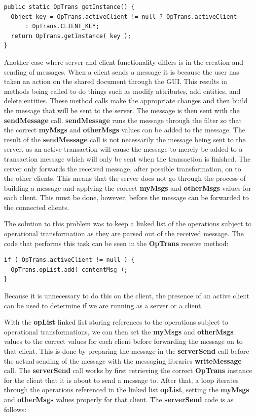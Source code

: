 \documentclass{article}
\begin{document}
\begin{verbatim}
public static OpTrans getInstance() {
  Object key = OpTrans.activeClient != null ? OpTrans.activeClient
      : OpTrans.CLIENT_KEY;
  return OpTrans.getInstance( key );
}
\end{verbatim}

Another case where server and client functionality differs is in the
creation and sending of messages.  When a client sends a message it is
because the user has taken an action on the shared document through
the GUI.  This results in methods being called to do things such as
modify attributes, add entities, and delete entities.  These method
calls make the appropriate changes and then build the message that
will be sent to the server.  The message is then sent with the
\textbf{sendMessage} call.  \textbf{sendMessage} runs the message
through the filter so
that the correct \textbf{myMsgs} and \textbf{otherMsgs} values can
be added to the
message.  The result of the \textbf{sendMessage} call is not necessarily the
message being sent to the server, as an active transaction will cause
the message to merely be added to a transaction message which will
only be sent when the transaction is finished.  The server only
forwards the received message, after possible transformation, on to
the other clients.  This means that the server does not go through the
process of building a message and applying the correct \textbf{myMsgs} and
\textbf{otherMsgs} values for each client.  This must be done, however, before
the message can be forwarded to the connected clients.

The solution to this problem was to keep a linked list of the
operations subject to operational transformation as they are parsed
out of the received message.  The code that performs this task can be
seen in the \textbf{OpTrans} receive method:

\begin{verbatim}
if ( OpTrans.activeClient != null ) {
  OpTrans.opList.add( contentMsg );
}
\end{verbatim}

Because it is unnecessary to do this on the client, the presence of an
active client can be used to determine if we are running as a server
or a client.

With the \textbf{opList} linked list storing references to the
operations subject to operational transformations, we can then set the
\textbf{myMsgs} and \textbf{otherMsgs} values to the correct values
for each client before forwarding the message on to that client.  This
is done by preparing the message in the \textbf{serverSend} call
before the actual sending of the message with the messaging libraries
\textbf{writeMessage} call.  The \textbf{serverSend} call works by
first retrieving the correct \textbf{OpTrans} instance for the client
that it is about to send a message to.  After that, a loop iterates
through the operations referenced in the linked list \textbf{opList},
setting the \textbf{myMsgs} and \textbf{otherMsgs} values properly for
that client.  The \textbf{serverSend} code is as follows:
\end{document}
